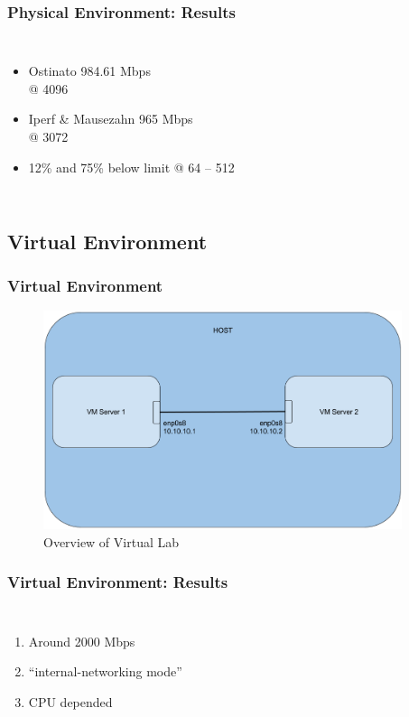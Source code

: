 \documentclass{beamer}
\begin{document}
\begin{frame}
  \frametitle{Physical Environment: Results}
  \begin{columns}[c] %
    
    \begin{itemize}
      \item Ostinato 984.61 Mbps \\@ 4096
      \item Iperf \& Mausezahn 965 Mbps \\@ 3072
      \item 12\% and 75\% below limit @ 64 -- 512
    \end{itemize}
  \end{columns}
\end{frame}

\subsection{Virtual Environment}
\begin{frame}
  \frametitle{Virtual Environment}
  \begin{figure}[h!]
    \centering
    \includegraphics[width=10.5cm]{../tex/figure/vmenv}
    \caption{Overview of Virtual Lab}
    \label{fig:vmenv}
  \end{figure}
\end{frame}

\begin{frame}
  \frametitle{Virtual Environment: Results}
  \begin{columns}[c] %
    
    \begin{enumerate}
      \item Around 2000 Mbps
      \item ``internal-networking mode''
      \item CPU depended
    \end{enumerate}
  \end{columns}
\end{frame}
\end{document}
